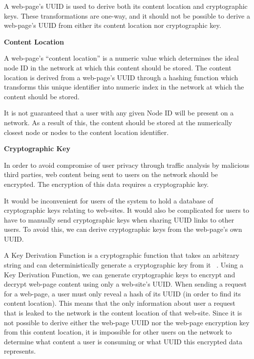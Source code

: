 A web-page's UUID is used to derive both its content location and cryptographic keys. These transformations are one-way,
and it should not be possible to derive a web-page's UUID from either its content location nor cryptographic key.

\textbf{Content Location}

A web-page's ``content location'' is a numeric value which determines the ideal node ID in the network at which this content
should be stored. The content location is derived from a web-page's UUID through a hashing function which transforms this unique
identifier into numeric index in the network at which the content should be stored.

It is not guaranteed that a user with any given Node ID will be present on a network. As a result of this, the content should be
stored at the numerically closest node or nodes to the content location identifier.

\textbf{Cryptographic Key}

In order to avoid compromise of user privacy through traffic analysis by malicious third parties, web content being sent to users
on the network should be encrypted. The encryption of this data requires a cryptographic key.

It would be inconvenient for users of the system to hold a database of cryptographic keys relating to web-sites. It would also be
complicated for users to have to manually send cryptographic keys when sharing UUID links to other users. To avoid this, we can
derive cryptographic keys from the web-page's own UUID.

A Key Derivation Function is a cryptographic function that takes an arbitrary string and can
deterministically generate a cryptographic key from it ~\cite{kdf}. Using a Key Derivation Function, we
can generate cryptographic keys to encrypt and decrypt web-page content using only a web-site's UUID.
When sending a request for a web-page, a user must only reveal a hash of its UUID (in order to
find its content location). This means that the only information about user a request that is leaked to the network
is the content location of that web-site. Since it is not possible to derive either the web-page UUID nor the web-page
encryption key from this content location, it is impossible for other users on the network to determine what content
a user is consuming or what UUID this encrypted data represents.

